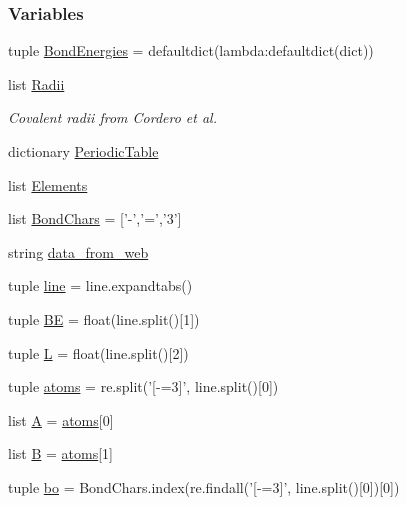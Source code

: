 \subsubsection*{\-Variables}
\begin{DoxyCompactItemize}
\item 
tuple \hyperlink{namespaceforcebalance_1_1chemistry_aa32672abf21f3992401f7869fef4b579}{\-Bond\-Energies} = defaultdict(lambda\-:defaultdict(dict))
\item 
list \hyperlink{namespaceforcebalance_1_1chemistry_a5db7a023d3980e17137379852d5c8551}{\-Radii}
\begin{DoxyCompactList}\small\item\em \-Covalent radii from \-Cordero et al. \end{DoxyCompactList}\item 
dictionary \hyperlink{namespaceforcebalance_1_1chemistry_a10486086db3bcc2c63c591c726b3464f}{\-Periodic\-Table}
\item 
list \hyperlink{namespaceforcebalance_1_1chemistry_a12ef5f22f5cc3798107d3585c77a1c84}{\-Elements}
\item 
list \hyperlink{namespaceforcebalance_1_1chemistry_a70b1983d2e59ef37617b0a80a3fd14c9}{\-Bond\-Chars} = \mbox{[}'-\/','=','3'\mbox{]}
\item 
string \hyperlink{namespaceforcebalance_1_1chemistry_a244dd58baf4c171b37316e64561c1021}{data\-\_\-from\-\_\-web}
\item 
tuple \hyperlink{namespaceforcebalance_1_1chemistry_a43d08c70d93e430fc6fd6689f622b61b}{line} = line.\-expandtabs()
\item 
tuple \hyperlink{namespaceforcebalance_1_1chemistry_a2e8b0b69254f9a7346919dc00f606e74}{\-B\-E} = float(line.\-split()\mbox{[}1\mbox{]})
\item 
tuple \hyperlink{namespaceforcebalance_1_1chemistry_ace6400fcf0f12a9d9f70aa7496984379}{\-L} = float(line.\-split()\mbox{[}2\mbox{]})
\item 
tuple \hyperlink{namespaceforcebalance_1_1chemistry_a769e0e6c4bad669c6786d1ff12354978}{atoms} = re.\-split('\mbox{[}-\/=3\mbox{]}', line.\-split()\mbox{[}0\mbox{]})
\item 
list \hyperlink{namespaceforcebalance_1_1chemistry_a4f490f29c23b8f185dc926e38eb7e746}{\-A} = \hyperlink{namespaceforcebalance_1_1chemistry_a769e0e6c4bad669c6786d1ff12354978}{atoms}\mbox{[}0\mbox{]}
\item 
list \hyperlink{namespaceforcebalance_1_1chemistry_a408afe99c28b09783c769307b8819f78}{\-B} = \hyperlink{namespaceforcebalance_1_1chemistry_a769e0e6c4bad669c6786d1ff12354978}{atoms}\mbox{[}1\mbox{]}
\item 
tuple \hyperlink{namespaceforcebalance_1_1chemistry_a1ef8f483a40113a668ff3743bb56d7ad}{bo} = \-Bond\-Chars.\-index(re.\-findall('\mbox{[}-\/=3\mbox{]}', line.\-split()\mbox{[}0\mbox{]})\mbox{[}0\mbox{]})
\end{DoxyCompactItemize}


